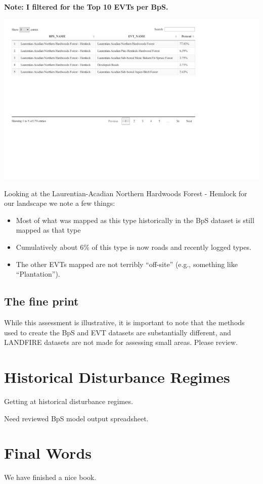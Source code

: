 \documentclass[
]{book}
\providecommand{\tightlist}{%
  \setlength{\itemsep}{0pt}\setlength{\parskip}{0pt}}
\begin{document}
\textbf{Note: I filtered for the Top 10 EVTs per BpS.}

\includegraphics{FSCBook_files/figure-latex/bpsEvtDT-1.pdf}

Looking at the Laurentian-Acadian Northern Hardwoods Forest - Hemlock for our landscape we note a few things:

\begin{itemize}
\tightlist
\item
  Most of what was mapped as this type historically in the BpS dataset is still mapped as that type
\item
  Cumulatively about 6\% of this type is now roads and recently logged types.
\item
  The other EVTs mapped are not terribly ``off-site'' (e.g., something like ``Plantation'').
\end{itemize}

\hypertarget{the-fine-print}{%
\section{The fine print}\label{the-fine-print}}

While this assessment is illustrative, it is important to note that the methods used to create the BpS and EVT datasets are substantially different, and LANDFIRE datasets are not made for assessing small areas. Please review.

\hypertarget{histDist}{%
\chapter{Historical Disturbance Regimes}\label{histDist}}

Getting at historical disturbance regimes.

Need reviewed BpS model output spreadsheet.

\hypertarget{final-words}{%
\chapter{Final Words}\label{final-words}}

We have finished a nice book.
\end{document}
